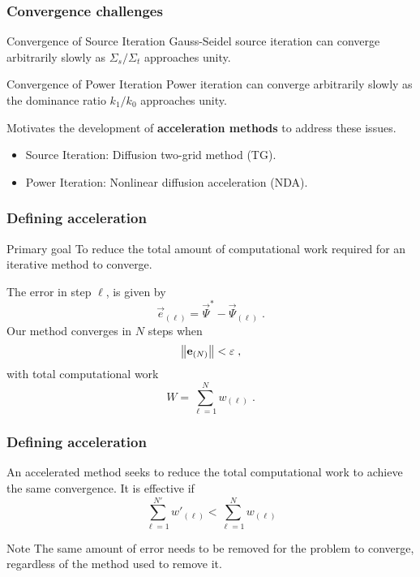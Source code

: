 \documentclass[xcolor=x11names, compress]{beamer}
\begin{document}
\begin{frame}
  \frametitle{Convergence challenges}
\begin{block}{Convergence of Source Iteration}
  Gauss-Seidel source iteration can converge arbitrarily slowly as
  $\Sigma_s/\Sigma_t$ approaches unity.
\end{block}
\pause
\begin{block}{Convergence of Power Iteration}
  Power iteration can converge arbitrarily slowly as the dominance
  ratio $k_1/k_0$ approaches unity.
\end{block}
\pause
Motivates the development of \textbf{acceleration methods} to address these issues.
\begin{itemize}
  \item Source Iteration: Diffusion two-grid method (TG).
  \item Power Iteration: Nonlinear diffusion acceleration (NDA).
\end{itemize}

\end{frame}
\begin{frame}
  \frametitle{Defining acceleration}
  \pause
  \begin{block}{Primary goal}
    To reduce the total amount of computational work required for an
    iterative method to converge\cite{adams1993}.
  \end{block}
\pause
The error in step $\ell$, is given by
\begin{equation*}
  \vec{e}_{(\ell)} = \vec{\Psi}^* - \vec{\Psi}_{(\ell)}\;.
\end{equation*}
\pause
Our method converges in $N$ steps when
\begin{equation*}
  \left\lVert\mathbf{e}_{(N)}\right\rVert < \varepsilon\;,
\end{equation*}
\pause
with total computational work
\begin{equation*}
  W = \sum_{\ell = 1}^N w_{(\ell)}\;.
\end{equation*}
\end{frame}
\begin{frame}
  \frametitle{Defining acceleration}
  An accelerated method seeks to reduce the total computational work
  to achieve the same convergence. It is effective if
  \begin{equation*}
    \sum_{\ell = 1}^{N'}w'_{(\ell)} <  \sum_{\ell = 1}^Nw_{(\ell)}
  \end{equation*}
\pause
  \begin{block}{Note}
    The same amount of error needs to be removed for the problem to
    converge, regardless of the method used to remove it.
  \end{block}
\end{frame}
\end{document}
